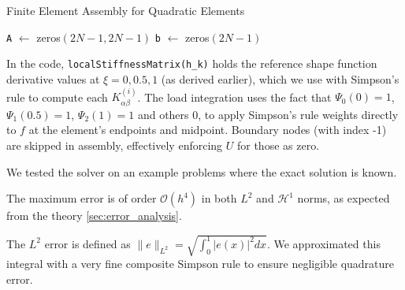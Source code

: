 \begin{algorithm}[H]
	\caption{Finite Element Assembly for Quadratic Elements}
	\label{alg:FEM_assembly}
	\BlankLine
	\texttt{A} \(\leftarrow\) zeros\((2N-1, 2N-1)\)\;
	\texttt{b} \(\leftarrow\) zeros\((2N-1)\)\;
	\BlankLine
	\BlankLine
\end{algorithm}

In the code, \texttt{localStiffnessMatrix(h\_k)} holds the reference shape function derivative values at \(\xi=0,0.5,1\) (as derived earlier), which we use with Simpson's rule to compute each \(K^{(i)}_{\alpha\beta}\).
The load integration uses the fact that \(\Psi_0(0)=1\), \(\Psi_1(0.5)=1\), \(\Psi_2(1)=1\) and others 0, to apply Simpson's rule weights directly to \(f\) at the element's endpoints and midpoint.
Boundary nodes (with index -1) are skipped in assembly, effectively enforcing \(U\) for those as zero.

We tested the solver on an example problems where the exact solution is known.


The maximum error is of order \(\mathcal{O}(h^{4})\) in both \(L^2\) and \(\mathcal{H}^1\) norms, as expected from the theory \ref{sec:error_analysis}.

The \(L^2\) error is defined as \(\|e\|_{L^2} = \sqrt{\int_0^1 |e(x)|^2 dx}\).
We approximated this integral with a very fine composite Simpson rule to ensure negligible quadrature error.

